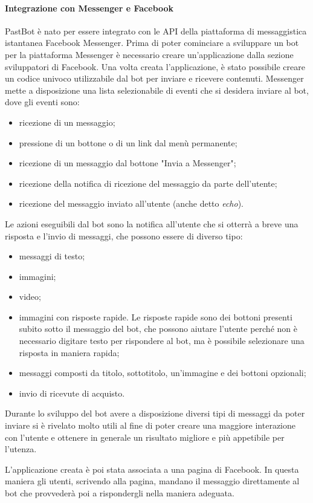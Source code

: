 \paragraph*{Integrazione con Messenger e Facebook}
PastBot è nato per essere integrato con le API della piattaforma di
messaggistica istantanea Facebook Messenger.
Prima di poter cominciare a sviluppare un bot per la piattaforma Messenger è
necessario creare un'applicazione dalla sezione sviluppatori di Facebook.
Una volta creata l'applicazione, è stato possibile creare un codice univoco
utilizzabile dal bot per inviare e ricevere contenuti.
Messenger mette a disposizione una lista selezionabile di eventi che si desidera
inviare al bot, dove gli eventi sono:
\begin{itemize}
  \item ricezione di un messaggio;
  \item pressione di un bottone o di un link dal menù permanente;
  \item ricezione di un messaggio dal bottone "Invia a Messenger";
  \item ricezione della notifica di ricezione del messaggio da parte
dell'utente;
  \item ricezione del messaggio inviato all'utente (anche detto \textit{echo}).
\end{itemize}

Le azioni eseguibili dal bot sono la notifica all'utente che si otterrà a breve
una risposta e l'invio di messaggi, che possono essere di diverso tipo:
\begin{itemize}
  \item messaggi di testo;
  \item immagini;
  \item video;
  \item immagini con risposte rapide. Le risposte rapide sono dei bottoni
presenti subito sotto il messaggio del bot, che possono aiutare l'utente perché
non è necessario digitare testo per rispondere al bot, ma è possibile
selezionare una risposta in maniera rapida;
  \item messaggi composti da titolo, sottotitolo, un'immagine e dei bottoni
opzionali;
  \item invio di ricevute di acquisto.
\end{itemize}

Durante lo sviluppo del bot avere a disposizione diversi tipi di messaggi da
poter inviare si è rivelato molto utili al fine di poter creare una maggiore
interazione con l'utente e ottenere in generale un risultato migliore e più
appetibile per l'utenza.

L'applicazione creata è poi stata associata a una pagina di Facebook. In questa
maniera gli utenti, scrivendo alla pagina, mandano il messaggio direttamente al
bot che provvederà poi a rispondergli nella maniera adeguata.

